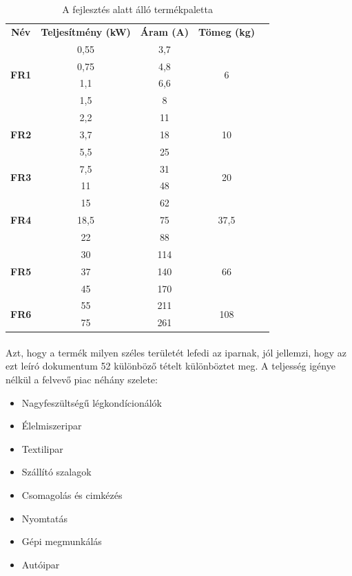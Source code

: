 \begin{table}[]
\centering
\begin{tabular}{|c|c|c|c|l}
\cline{1-4}
\textbf{Név} & \textbf{Teljesítmény (kW)} & \textbf{Áram (A)} & \textbf{Tömeg (kg)} &  \\ \cline{1-4}
\multirow{4}{*}{\textbf{FR1}} & 0,55 & 3,7 & \multirow{4}{*}{6} &  \\ \cline{2-3}
 & 0,75 & 4,8 &  &  \\ \cline{2-3}
 & 1,1 & 6,6 &  &  \\ \cline{2-3}
 & 1,5 & 8 &  &  \\ \cline{1-4}
\multirow{3}{*}{\textbf{FR2}} & 2,2 & 11 & \multirow{3}{*}{10} &  \\ \cline{2-3}
 & 3,7 & 18 &  &  \\ \cline{2-3}
 & 5,5 & 25 &  &  \\ \cline{1-4}
\multirow{2}{*}{\textbf{FR3}} & 7,5 & 31 & \multirow{2}{*}{20} &  \\ \cline{2-3}
 & 11 & 48 &  &  \\ \cline{1-4}
\multirow{3}{*}{\textbf{FR4}} & 15 & 62 & \multirow{3}{*}{37,5} &  \\ \cline{2-3}
 & 18,5 & 75 &  &  \\ \cline{2-3}
 & 22 & 88 &  &  \\ \cline{1-4}
\multirow{3}{*}{\textbf{FR5}} & 30 & 114 & \multirow{3}{*}{66} &  \\ \cline{2-3}
 & 37 & 140 &  &  \\ \cline{2-3}
 & 45 & 170 &  &  \\ \cline{1-4}
\multirow{2}{*}{\textbf{FR6}} & 55 & 211 & \multirow{2}{*}{108} &  \\ \cline{2-3}
 & 75 & 261 &  &  \\ \cline{1-4}
\end{tabular}
\caption{A fejlesztés alatt álló termékpaletta}
\label{fig:family}
\end{table}

\paragraph{}
Azt, hogy a termék milyen széles területét lefedi az iparnak, jól jellemzi, hogy az ezt leíró dokumentum 52 különböző tételt különböztet meg. A teljesség igénye nélkül a felvevő piac néhány szelete:

\begin{itemize}
	\item{Nagyfeszültségű légkondícionálók}
	\item{Élelmiszeripar}
	\item{Textilipar}
	\item{Szállító szalagok}
	\item{Csomagolás és cimkézés}
	\item{Nyomtatás}
	\item{Gépi megmunkálás}
	\item{Autóipar}
\end{itemize}

